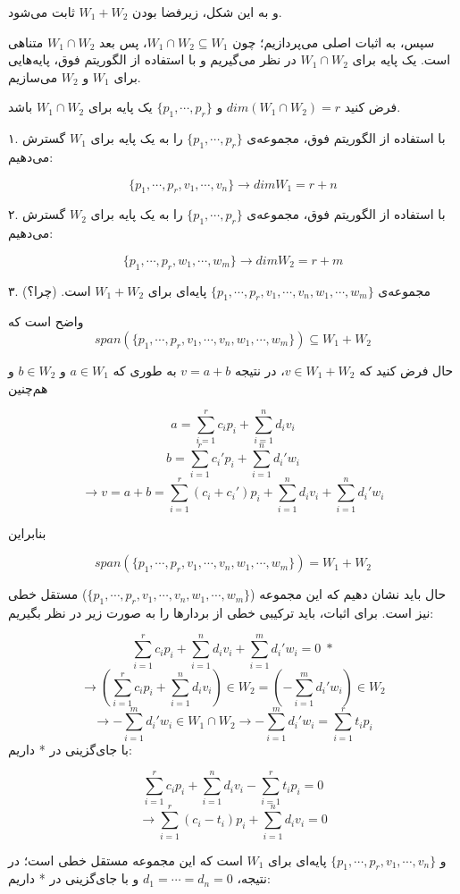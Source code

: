 و به این شکل، زیرفضا بودن $W_1 + W_2$ ثابت می‌شود.

سپس، به اثبات اصلی می‌پردازیم؛ چون $W_1 \cap W_2 \subseteq W_1$، پس بعد $W_1 \cap W_2$ متناهی است. یک پایه برای $W_1 \cap W_2$ در نظر می‌گیریم و با استفاده از الگوریتم فوق، پایه‌هایی برای $W_1$ و $W_2$ می‌سازیم.

فرض کنید $dim(W_1 \cap W_2)=r$ و $\{ p_1,\cdots,p_r \}$ یک پایه برای $W_1 \cap W_2$ باشد.

۱. با استفاده از الگوریتم فوق، مجموعه‌ی  $\{ p_1,\cdots,p_r \}$ را به یک پایه برای $W_1$ گسترش می‌دهیم:

$$\{ p_1,\cdots,p_r, v_1, \cdots, v_n \} \to dim W_1 = r + n $$

۲. با استفاده از الگوریتم فوق، مجموعه‌ی  $\{ p_1,\cdots,p_r \}$ را به یک پایه برای $W_2$ گسترش می‌دهیم:

$$\{ p_1,\cdots,p_r, w_1, \cdots, w_m \} \to dim W_2 = r + m $$

۳. مجموعه‌ی $\{ p_1,\cdots,p_r, v_1, \cdots, v_n, w_1, \cdots, w_m \}$ پایه‌ای برای $W_1 + W_2$ است. (چرا؟)

واضح است که
$$ span(\{ p_1,\cdots, p_r, v_1,\cdots, v_n, w_1, \cdots, w_m \}) \subseteq W_1 + W_2 $$

حال فرض کنید که $v \in W_1 + W_2$، در نتیجه $v = a + b$ به طوری که $a \in W_1$ و $b \in W_2$ و هم‌چنین

$$ a = \sum_{i=1}^r c_i p_i + \sum_{i=1}^n d_i v_i $$
$$ b = \sum_{i=1}^r c_i ' p_i + \sum_{i=1}^n d_i ' w_i $$
$$ \to v = a + b = \sum_{i=1}^r (c_i + c_i ') p_i + \sum_{i=1}^n d_i v_i + \sum_{i=1}^n d_i ' w_i $$

بنابراین

$$ span(\{ p_1,\cdots, p_r, v_1,\cdots, v_n, w_1, \cdots, w_m \}) = W_1 + W_2 $$

حال باید نشان دهیم که این مجموعه ($\{ p_1,\cdots, p_r, v_1,\cdots, v_n, w_1, \cdots, w_m \}$) مستقل خطی نیز است. برای اثبات، باید ترکیبی خطی از بردارها را به صورت زیر در نظر بگیریم:

$$ \sum_{i=1}^r c_i p_i + \sum_{i=1}^n d_i v_i + \sum_{i=1}^m d_i ' w_i  = 0 \; *$$
$$ \to (\sum_{i=1}^r c_i p_i + \sum_{i=1}^n d_i v_i) \in W_2 = (- \sum_{i=1}^m d_i ' w_i) \in W_2$$
$$ \to - \sum_{i=1}^m d_i ' w_i \in W_1 \cap W_2 \to - \sum_{i=1}^m d_i ' w_i = \sum_{i=1}^r t_i p_i$$
با جای‌گزینی در * داریم:

$$ \sum_{i=1}^r c_i p_i + \sum_{i=1}^n d_i v_i - \sum_{i=1}^r t_i p_i  = 0 $$
$$ \to \sum_{i=1}^r (c_i - t_i) p_i + \sum_{i=1}^n d_i v_i = 0 $$

و $\{ p_1,\cdots, p_r, v_1,\cdots, v_n \}$ پایه‌ای برای $W_1$ است که این مجموعه مستقل خطی است؛ در نتیجه، $d_1 = \cdots = d_n = 0$ و با جای‌گزینی در * داریم:

